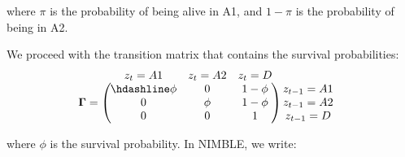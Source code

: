 \documentclass[
  12pt,
]{krantz}
\begin{document}
where \(\pi\) is the probability of being alive in A1, and \(1 - \pi\) is the probability of being in A2.

We proceed with the transition matrix that contains the survival probabilities:
\[\begin{matrix}
& \\
\mathbf{\Gamma} =
  \left ( \vphantom{ \begin{matrix} 12 \\ 12 \\ 12 \end{matrix} } \right .
          \end{matrix}
          \hspace{-1.2em}
          \begin{matrix}
          z_t=A1 & z_t=A2 & z_t=D \\ \hdashline
          \phi  & 0 & 1 - \phi\\
          0 & \phi & 1 - \phi\\
          0 & 0 & 1
          \end{matrix}
          \hspace{-0.2em}
          \begin{matrix}
          & \\
          \left . \vphantom{ \begin{matrix} 12 \\ 12 \\ 12 \end{matrix} } \right )
\begin{matrix}
z_{t-1}=A1 \\ z_{t-1}=A2 \\ z_{t-1}=D
\end{matrix}
\end{matrix}\]

where \(\phi\) is the survival probability. In NIMBLE, we write:
\end{document}
